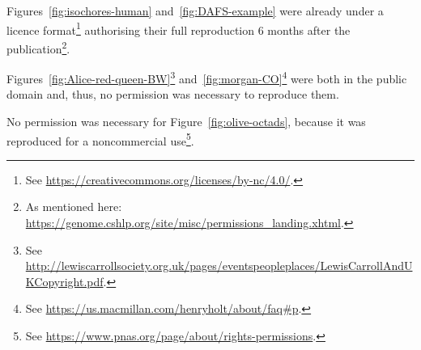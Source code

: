 Figures~\ref{fig:isochores-human} and~\ref{fig:DAFS-example} were already under a licence format\footnote{See \url{https://creativecommons.org/licenses/by-nc/4.0/}.} authorising their full reproduction 6 months after the publication\footnote{As mentioned here: \url{https://genome.cshlp.org/site/misc/permissions_landing.xhtml}.}.

Figures~\ref{fig:Alice-red-queen-BW}\footnote{See \url{http://lewiscarrollsociety.org.uk/pages/eventspeopleplaces/LewisCarrollAndUKCopyright.pdf}.} 
and~\ref{fig:morgan-CO}\footnote{See \url{https://us.macmillan.com/henryholt/about/faq\#p}.}
were both in the public domain and, thus, no permission was necessary to reproduce them.

No permission was necessary for Figure~\ref{fig:olive-octads}, because it was reproduced for a noncommercial use\footnote{See \url{https://www.pnas.org/page/about/rights-permissions}.}.

%
%
%
%
%
%
%
%




